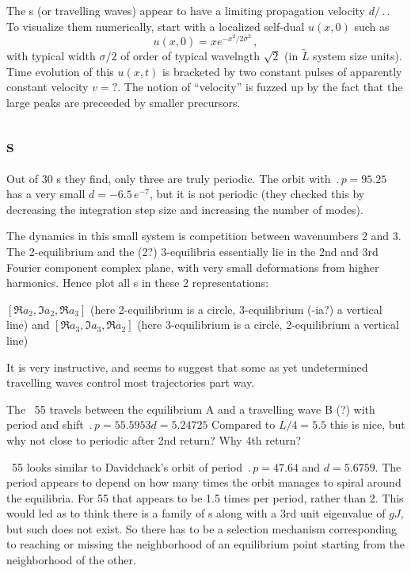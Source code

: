 The \reqva s (or travelling waves) appear to have a limiting propagation
velocity $d/\period{}$. 
To visualize them numerically,
start with a localized self-dual $u(x,0)$ such as
\[
u(x,0) = x e^{- x^2/2\sigma^2}
\,,
\]
with typical width $\sigma/2$ of order of typical wavelngth 
$\sqrt{2}$ (in $\tilde{L}$ system size units).
Time evolution of this  $u(x,t)$ is bracketed by two constant 
pulses of apparently constant velocity $v=?$.
The notion of ``velocity''
is fuzzed up by the fact that the large peaks are preceeded
by smaller precursors.


\subsection{\Rpo s}

%
Out of 30 \rpo s they
find,  only three are truly periodic.  The orbit
with $\period{p} = 95.25$ has a very small
$d = -6.5\,e^{-7}$, but it is not periodic 
(they
checked this by decreasing the integration step size and increasing the
number of modes).

The dynamics in this small system is competition between wavenumbers
2 and 3. The 2-equilibrium and the (2?) 3-equilibria essentially lie in
the 2nd and 3rd Fourier component complex plane, with very
small deformations from higher harmonics.
Hence plot all \rpo s in these 2 representations:

$[ \Re a_2, \Im a_2, \Re a_3 ]$
(here 2-equilibrium is a circle, 3-equilibrium (-ia?) a vertical line)
 and
$[ \Re a_3, \Im a_3, \Re a_2 ]$
(here 3-equilibrium is a circle, 2-equilibrium a vertical line)

It is very instructive, and seems to suggest that some as yet
undetermined travelling waves control most trajectories part way.

The \rpo\ {\nameit}55 travels between the equilibrium A and a
travelling wave B (?) 
with period and shift
$\period{p}=55.5953 d=5.24725$
Compared to $L/4 = 5.5$
this is nice, but why not close to periodic after 2nd return? Why 4th return?

\Rpo\ {\nameit}55 looks similar to Davidchack's  orbit
of period 
$\period{p}=47.64$ and $d=5.6759$. The period appears to depend on how
many times the orbit manages to spiral around the equilibria.
For {\nameit}55 that appears to be
1.5 times per period, rather than 2. This would led as
to
think there is a family of \rpo s along with a 3rd unit eigenvalue of
$gJ$,
but such does not exist.
So there has to be a selection mechanism corresponding to
reaching or missing the neighborhood of an equilibrium point starting from
the neighborhood of the other. 

